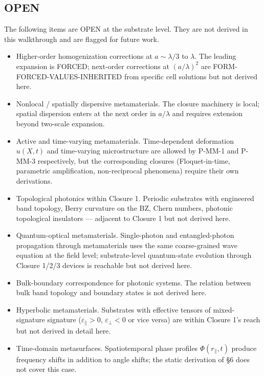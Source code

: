 \documentclass[11pt,a4paper]{article}
\begin{document}
\subsection{OPEN}

The following items are OPEN at the substrate level. They are not derived in this walkthrough and are flagged for future work.

\begin{itemize}[noitemsep]
\item Higher-order homogenization corrections at $a \sim \lambda/3$ to $\lambda$. The leading expansion is FORCED; next-order corrections at $(a/\lambda)^2$ are FORM-FORCED-VALUES-INHERITED from specific cell solutions but not derived here.
\item Nonlocal / spatially dispersive metamaterials. The closure machinery is local; spatial dispersion enters at the next order in $a/\lambda$ and requires extension beyond two-scale expansion.
\item Active and time-varying metamaterials. Time-dependent deformation $u(X, t)$ and time-varying microstructure are allowed by P-MM-1 and P-MM-3 respectively, but the corresponding closures (Floquet-in-time, parametric amplification, non-reciprocal phenomena) require their own derivations.
\item Topological photonics within Closure 1. Periodic substrates with engineered band topology, Berry curvature on the BZ, Chern numbers, photonic topological insulators --- adjacent to Closure 1 but not derived here.
\item Quantum-optical metamaterials. Single-photon and entangled-photon propagation through metamaterials uses the same coarse-grained wave equation at the field level; substrate-level quantum-state evolution through Closure 1/2/3 devices is reachable but not derived here.
\item Bulk-boundary correspondence for photonic systems. The relation between bulk band topology and boundary states is not derived here.
\item Hyperbolic metamaterials. Substrates with effective tensors of mixed-signature signature ($\varepsilon_\parallel > 0$, $\varepsilon_\perp < 0$ or vice versa) are within Closure 1's reach but not derived in detail here.
\item Time-domain metasurfaces. Spatiotemporal phase profiles $\Phi(r_\parallel, t)$ produce frequency shifts in addition to angle shifts; the static derivation of \S6 does not cover this case.
\end{itemize}
\end{document}
